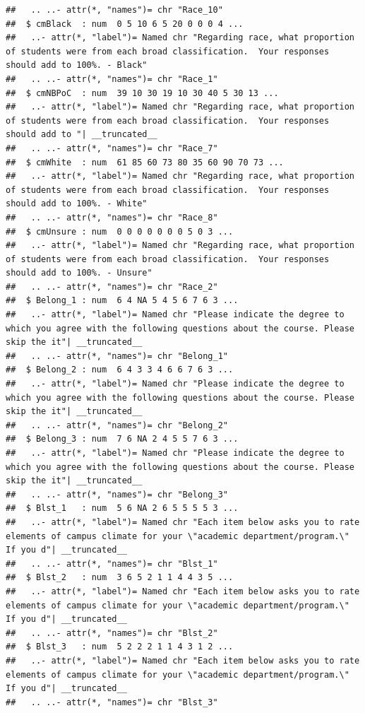 \documentclass[
  11pt,
]{book}
\begin{document}
\begin{verbatim}
##   .. ..- attr(*, "names")= chr "Race_10"
##  $ cmBlack  : num  0 5 10 6 5 20 0 0 0 4 ...
##   ..- attr(*, "label")= Named chr "Regarding race, what proportion of students were from each broad classification.  Your responses should add to 100%. - Black"
##   .. ..- attr(*, "names")= chr "Race_1"
##  $ cmNBPoC  : num  39 10 30 19 10 30 40 5 30 13 ...
##   ..- attr(*, "label")= Named chr "Regarding race, what proportion of students were from each broad classification.  Your responses should add to "| __truncated__
##   .. ..- attr(*, "names")= chr "Race_7"
##  $ cmWhite  : num  61 85 60 73 80 35 60 90 70 73 ...
##   ..- attr(*, "label")= Named chr "Regarding race, what proportion of students were from each broad classification.  Your responses should add to 100%. - White"
##   .. ..- attr(*, "names")= chr "Race_8"
##  $ cmUnsure : num  0 0 0 0 0 0 0 5 0 3 ...
##   ..- attr(*, "label")= Named chr "Regarding race, what proportion of students were from each broad classification.  Your responses should add to 100%. - Unsure"
##   .. ..- attr(*, "names")= chr "Race_2"
##  $ Belong_1 : num  6 4 NA 5 4 5 6 7 6 3 ...
##   ..- attr(*, "label")= Named chr "Please indicate the degree to which you agree with the following questions about the course. Please skip the it"| __truncated__
##   .. ..- attr(*, "names")= chr "Belong_1"
##  $ Belong_2 : num  6 4 3 3 4 6 6 7 6 3 ...
##   ..- attr(*, "label")= Named chr "Please indicate the degree to which you agree with the following questions about the course. Please skip the it"| __truncated__
##   .. ..- attr(*, "names")= chr "Belong_2"
##  $ Belong_3 : num  7 6 NA 2 4 5 5 7 6 3 ...
##   ..- attr(*, "label")= Named chr "Please indicate the degree to which you agree with the following questions about the course. Please skip the it"| __truncated__
##   .. ..- attr(*, "names")= chr "Belong_3"
##  $ Blst_1   : num  5 6 NA 2 6 5 5 5 5 3 ...
##   ..- attr(*, "label")= Named chr "Each item below asks you to rate elements of campus climate for your \"academic department/program.\"  If you d"| __truncated__
##   .. ..- attr(*, "names")= chr "Blst_1"
##  $ Blst_2   : num  3 6 5 2 1 1 4 4 3 5 ...
##   ..- attr(*, "label")= Named chr "Each item below asks you to rate elements of campus climate for your \"academic department/program.\"  If you d"| __truncated__
##   .. ..- attr(*, "names")= chr "Blst_2"
##  $ Blst_3   : num  5 2 2 2 1 1 4 3 1 2 ...
##   ..- attr(*, "label")= Named chr "Each item below asks you to rate elements of campus climate for your \"academic department/program.\"  If you d"| __truncated__
##   .. ..- attr(*, "names")= chr "Blst_3"

\end{verbatim}
\end{document}
